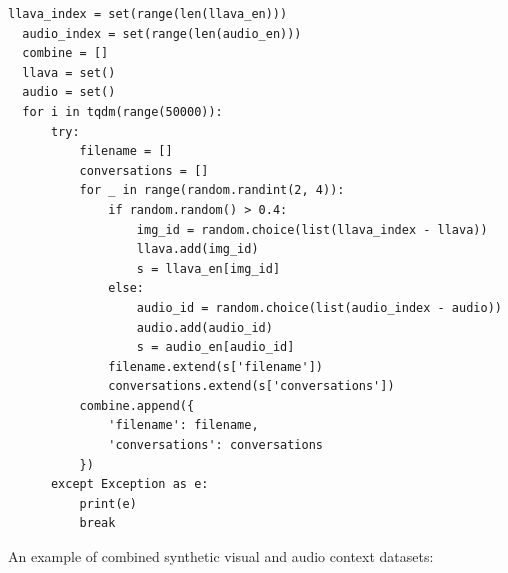 \documentclass[preprint]{article}
\begin{document}
\begin{lstlisting}[breaklines=true]
  llava_index = set(range(len(llava_en)))
  audio_index = set(range(len(audio_en)))
  combine = []
  llava = set()
  audio = set()
  for i in tqdm(range(50000)):
      try:
          filename = []
          conversations = []
          for _ in range(random.randint(2, 4)):
              if random.random() > 0.4:
                  img_id = random.choice(list(llava_index - llava))
                  llava.add(img_id)
                  s = llava_en[img_id]
              else:
                  audio_id = random.choice(list(audio_index - audio))
                  audio.add(audio_id)
                  s = audio_en[audio_id]
              filename.extend(s['filename'])
              conversations.extend(s['conversations'])
          combine.append({
              'filename': filename,
              'conversations': conversations
          })
      except Exception as e:
          print(e)
          break
\end{lstlisting}

An example of combined synthetic visual and audio context datasets:
\end{document}
